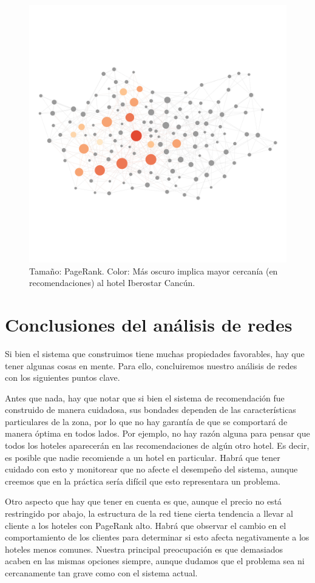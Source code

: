 \documentclass[12pt]{report}
\begin{document}
\begin{figure}[ht]
	\centering
	\includegraphics[height=0.75\textwidth, angle=90,
		trim = 100 900 100 900, clip]{imagenes/cancun_iberostar2.png}
	\caption{\label{fig:cancun_iberostar} Tamaño: PageRank. Color: Más oscuro implica mayor cercanía (en recomendaciones) al hotel Iberostar Cancún.}
\end{figure}

\section{Conclusiones del análisis de redes}

Si bien el sistema que construimos tiene muchas propiedades favorables, hay que tener algunas cosas en mente. Para ello, concluiremos nuestro análisis de redes con los siguientes puntos clave.

Antes que nada, hay que notar que si bien el sistema de recomendación fue construido de manera cuidadosa, sus bondades dependen de las características particulares de la zona, por lo que no hay garantía de que se comportará de manera óptima en todos lados. Por ejemplo, no hay razón alguna para pensar que todos los hoteles aparecerán en las recomendaciones de algún otro hotel. Es decir, es posible que nadie recomiende a un hotel en particular. Habrá que tener cuidado con esto y monitorear que no afecte el desempeño del sistema, aunque creemos que en la práctica sería difícil que esto representara un problema.

Otro aspecto que hay que tener en cuenta es que, aunque el precio no está restringido por abajo, la estructura de la red tiene cierta tendencia a llevar al cliente a los hoteles con PageRank alto. Habrá que observar el cambio en el comportamiento de los clientes para determinar si esto afecta negativamente a los hoteles menos comunes. Nuestra principal preocupación es que demasiados acaben en las mismas opciones siempre, aunque dudamos que el problema sea ni cercanamente tan grave como con el sistema actual.
\end{document}
